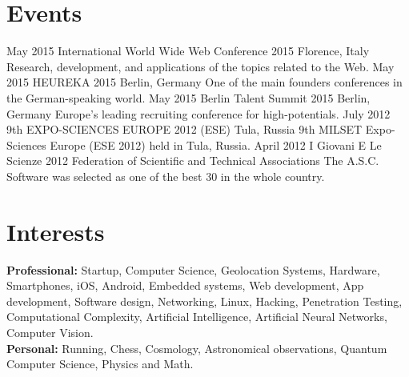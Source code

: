 \documentclass[]{friggeri-cv}
\begin{document}

\section{Events}
\vspace{-3mm}
\begin{entrylist}
\entry
{May 2015}
{International World Wide Web Conference 2015}
{Florence, Italy}
{Research, development, and applications of the topics related to the Web.}
\entry
{May 2015}
{HEUREKA 2015}
{Berlin, Germany}
{One of the main founders conferences in the German­-speaking world.}
\entry
{May 2015}
{Berlin Talent Summit 2015}
{Berlin, Germany}
{Europe's leading recruiting conference for high-potentials.}
\entry
{July 2012}
{9th EXPO-SCIENCES EUROPE 2012 (ESE)}
{Tula, Russia}
{9th MILSET Expo-Sciences Europe (ESE 2012) held in Tula, Russia.}
\entry
{April 2012}
{I Giovani E Le Scienze 2012}
{Federation of Scientific and Technical Associations}
{The A.S.C. Software was selected as one of the best 30 in the whole country.}
\end{entrylist}


\section{Interests}
\vspace{-3mm}
\textbf{Professional:} Startup, Computer Science, Geolocation Systems, Hardware, Smartphones, iOS, Android, Embedded systems, Web development, App development, Software design, Networking, Linux, Hacking, Penetration Testing, Computational Complexity, Artificial Intelligence, Artificial Neural Networks, Computer Vision.\\
\textbf{Personal:} Running, Chess, Cosmology, Astronomical observations, Quantum Computer Science, Physics and Math.

\clearpage
\end{document}
